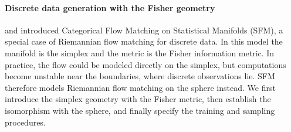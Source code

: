 \paragraph{Discrete data generation with the Fisher geometry}
\citet{Cheng2024} and \citet{Davis2024} introduced Categorical Flow Matching on Statistical Manifolds (SFM), a special case of Riemannian flow matching for discrete data. In this model the manifold is the simplex and the metric is the Fisher information metric. In practice, the flow could be modeled directly on the simplex, but computations become unstable near the boundaries, where discrete observations lie. SFM therefore models  Riemannian flow matching on the sphere instead. We first introduce the simplex geometry with the Fisher metric, then establish the isomorphism with the sphere, and finally specify the training and sampling procedures. 

